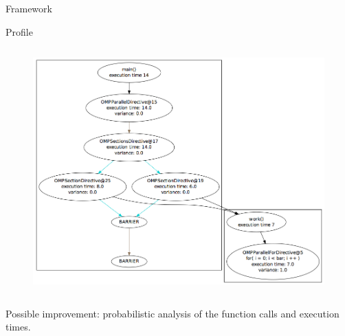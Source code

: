 \documentclass[xcolor=dvipsnames]{beamer}
\begin{document}
\begin{section}{Framework}
\begin{frame}{\hskip 0.3cm Profile}
\begin{columns}
\begin{column}{7.5cm}
\vskip -0.5cm
\begin{figure}
\centering
\includegraphics[scale=0.22]{call_graph.png}

\end{figure}
\end{column}

\end{columns}

Possible improvement: probabilistic analysis of the function calls and execution times.


\end{frame}





\begin{frame}{\hskip 0.3cm }
\begin{columns}
\begin{column}{6.5cm}
\vskip -1.2cm


\end{column}
\end{columns}
\end{frame}
\end{section}
\end{document}
